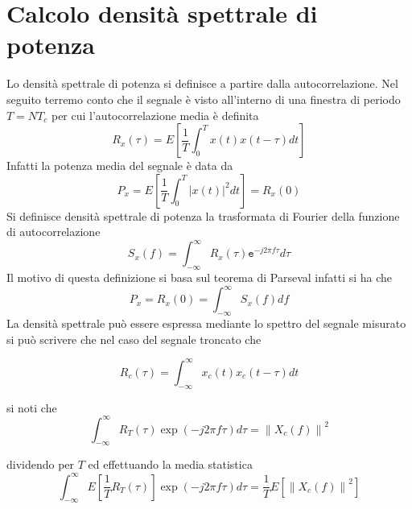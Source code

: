\documentclass[10pt,a4paper]{book}
\begin{document}
\section{Calcolo densità spettrale di potenza}
Lo densità spettrale di potenza si definisce a partire dalla  autocorrelazione. Nel seguito terremo conto che il segnale è visto all'interno di una finestra di periodo $T = N T_c$ per cui l'autocorrelazione media è definita
\begin{equation}
R_x(\tau) = E \left [ \frac{1}{ T} \int_{0}^T x(t)x(t-\tau) dt \right ] 
\end{equation}
Infatti la potenza media del segnale è data da 
\begin{equation}
P_{x} = E\left[ \frac{1}{ T} \int_{0}^T {\left|x(t)\right|}^2 dt \right ]=R_{x}(0)
\end{equation}
Si definisce densità spettrale di potenza la trasformata di Fourier della funzione di autocorrelazione
\begin{equation}
S_{x}(f) = \int_{-\infty}^{\infty}R_{x}(\tau) \mathtt{e}^ {-j 2 \pi f \tau} d\tau
\end{equation}
Il motivo di questa definizione si basa sul teorema di Parseval infatti si ha che 
\begin{equation}
P_{x} = R_{x}(0) = \int_{-\infty}^\infty S_{x}(f) df
\end{equation}
La densità spettrale può essere espressa mediante lo spettro del segnale misurato si può scrivere che nel caso del segnale troncato che 

\begin{equation}
R_c(\tau) = \int_{-\infty}^{\infty}  x_c(t)x_c(t- \tau) dt
\end{equation}

si noti che 
\begin{equation}
\int_{-\infty}^{\infty} R_T(\tau) \exp(-j 2 \pi f \tau) d\tau = {\|X_c(f)\|}^2
\end{equation}

dividendo per $T$ ed effettuando la media statistica
\begin{equation}
\int_{-\infty}^{\infty} E\left[ \frac{1}{T} R_T(\tau)\right ] \exp(-j 2 \pi f \tau) d\tau = \frac{1}{T} E \left[ {\|X_c(f)\|}^2 \right]
\end{equation}
\end{document}
